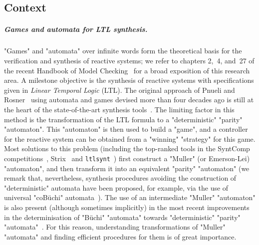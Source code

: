 \documentclass{theoretics}
\begin{document}
	\subsection*{Context}
\subparagraph{Games and automata for LTL synthesis.} "Games" and "automata" over infinite words form the theoretical basis for the verification and synthesis of reactive systems; we refer to chapters 2,~4, and~27 of the recent Handbook of Model Checking~\cite{PitermanPnueli2018Handbook,Kupferman2018Handbook,BloemCJ2018Handbook} for a broad exposition of this research area.
A milestone objective is the synthesis of reactive systems with specifications given in \emph{Linear Temporal Logic} (LTL).
The original approach of Pnueli and Rosner~\cite{PR89Synthesis} using automata and games devised more than four decades ago is still at the heart of the state-of-the-art synthesis tools~\cite{EKRS17FromLTLtoParity,LMS20SynthesisLTL,MichaudColange18Synt,MullerSickert17LTLtoDeterministic}.
The limiting factor in this method is the transformation of the LTL formula to a "deterministic" "parity" "automaton". This "automaton" is then used to build a "game", and a controller for the reactive system can be obtained from a "winning" "strategy" for this game.
Most solutions to this problem (including the top-ranked tools in the SyntComp competitions~\cite{SyntCompReport22}, Strix~\cite{LMS20SynthesisLTL, MS21ModernisingStrix} and \texttt{ltlsynt}~\cite{MichaudColange18Synt})  first construct a  "Muller" (or Emerson-Lei) "automaton", and then transform it into an equivalent "parity" "automaton" (we remark that, nevertheless, synthesis procedures avoiding the construction of "deterministic" automata have been proposed, for example, via the use of universal "coB\"uchi" automata~\cite{KV05Safraless}).
The use of an intermediate "Muller" "automaton" is also present (although sometimes implicitly) in the most recent improvements in the determinisation  of "B\"uchi" "automata" towards "deterministic" "parity" "automata"~\cite{LodingP19,Piterman2006fromNDBuchi,Schewe2009tighter}. For this reason, understanding transformations of "Muller" "automata" and finding efficient procedures for them is of great importance.
\end{document}
